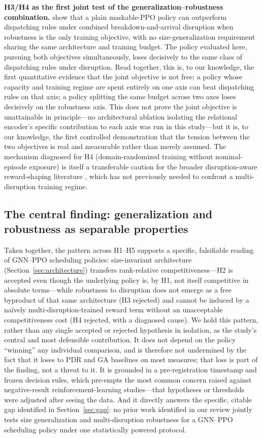 \documentclass[11pt]{article}
\begin{document}
\textbf{H3/H4 as the first joint test of the generalization--robustness combination.} \citet{lassoued2026} show that a plain maskable-PPO policy can outperform dispatching rules under combined breakdown-and-arrival disruption when robustness is the only training objective, with no size-generalization requirement sharing the same architecture and training budget. The policy evaluated here, pursuing both objectives simultaneously, loses decisively to the same class of dispatching rules under disruption. Read together, this is, to our knowledge, the first quantitative evidence that the joint objective is not free: a policy whose capacity and training regime are spent entirely on one axis can beat dispatching rules on that axis; a policy splitting the same budget across two axes loses decisively on the robustness axis. This does not prove the joint objective is unattainable in principle---no architectural ablation isolating the relational encoder's specific contribution to each axis was run in this study---but it is, to our knowledge, the first controlled demonstration that the tension between the two objectives is real and measurable rather than merely assumed. The mechanism diagnosed for H4 (domain-randomized training without nominal-episode exposure) is itself a transferable caution for the broader disruption-aware reward-shaping literature \citep{zhang2024rewardshaping}, which has not previously needed to confront a multi-disruption training regime.

\subsection{The central finding: generalization and robustness as separable properties}

Taken together, the pattern across H1--H5 supports a specific, falsifiable reading of GNN--PPO scheduling policies: size-invariant architecture (Section~\ref{sec:architecture}) transfers rank-relative competitiveness---H2 is accepted even though the underlying policy is, by H1, not itself competitive in absolute terms---while robustness to disruption does not emerge as a free byproduct of that same architecture (H3 rejected) and cannot be induced by a na\"ively multi-disruption-trained reward term without an unacceptable competitiveness cost (H4 rejected, with a diagnosed cause). We hold this pattern, rather than any single accepted or rejected hypothesis in isolation, as the study's central and most defensible contribution. It does not depend on the policy ``winning'' any individual comparison, and is therefore not undermined by the fact that it loses to PDR and GA baselines on most measures; that loss is part of the finding, not a threat to it. It is grounded in a pre-registration timestamp and frozen decision rules, which pre-empts the most common concern raised against negative-result reinforcement-learning studies---that hypotheses or thresholds were adjusted after seeing the data. And it directly answers the specific, citable gap identified in Section~\ref{sec:gap}: no prior work identified in our review jointly tests size generalization and multi-disruption robustness for a GNN--PPO scheduling policy under one statistically powered protocol.
\end{document}

